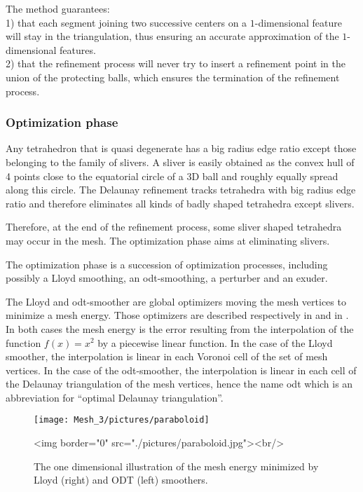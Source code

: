 The method guarantees:\\
1) that each segment joining
two successive centers on a $1$-dimensional feature will stay in the triangulation,
thus ensuring an accurate approximation of  the $1$-dimensional features. \\
2) that the refinement process will never try to insert a refinement point in the union of the
protecting balls, which ensures the termination of the refinement process.



\subsubsection{Optimization phase}

Any tetrahedron that is quasi degenerate has a big radius edge ratio except
those belonging to the family of slivers.  A sliver is easily obtained 
as the convex hull of 4 points close to the equatorial circle of a 3D
ball and roughly equally spread along this circle.
The Delaunay refinement tracks tetrahedra with big radius edge ratio 
and therefore eliminates all kinds of 
 badly shaped tetrahedra except slivers.

Therefore, at the end of the refinement process,
some sliver shaped tetrahedra may occur in the mesh.
The optimization phase aims at eliminating slivers.

The optimization phase is a succession of optimization processes,
including possibly a Lloyd smoothing, an odt-smoothing,
a perturber and an exuder.

The  Lloyd and odt-smoother are global optimizers
 moving the  mesh vertices to  minimize  
a   mesh energy.   Those optimizers are described respectively in 
\cite{cgal:dfg-cvtaa-99t, cgal:dw-tmgob-02} and  in \cite{cgal::c-mssbo-04,cgal:acyd-vtm-05}.
In both cases the mesh energy
is  the   error  resulting from the interpolation 
of the function $f(x) =x^2$ by a  piecewise linear function.
In the case of the Lloyd smoother,
the interpolation  is  linear in each Voronoi cell of the set of  mesh vertices.
In the case of the odt-smoother,  the interpolation is linear in each cell 
of the Delaunay triangulation of the  mesh vertices,
hence the name odt which is an  abbreviation for ``optimal Delaunay triangulation''.


\begin{figure}[ht]
\begin{center}
 \begin{ccTexOnly}
   \texttt{[image: Mesh\_3/pictures/paraboloid]}
 \end{ccTexOnly}
 \begin{ccHtmlOnly}
   <img border="0" src="./pictures/paraboloid.jpg"><br/>
 \end{ccHtmlOnly}
 \caption{The one dimensional illustration of the mesh energy minimized by Lloyd (right)  and ODT (left) smoothers.}
  \label{figure:ODT_Lloyd_energy}
\end{center}
\end{figure}


